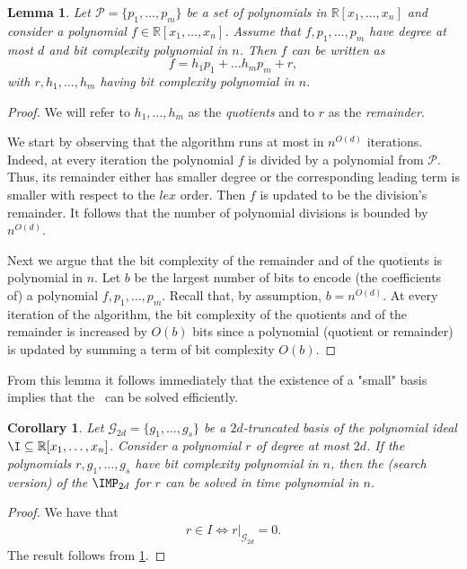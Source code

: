 \documentclass[11pt]{article}
\newtheorem{lemma}[theorem]{Lemma}
\newtheorem{corollary}[theorem]{Corollary}
\begin{document}
\begin{lemma}\label{th:complexity_polynomial_division}
    Let $\mathcal{P} = \{p_1, \dots, p_m\}$ be a set of polynomials in $\mathbb{R}[x_1, \dots, x_n]$ and consider a polynomial $f \in \mathbb{R}[x_1, \dots, x_n]$. Assume that $f, p_1, \dots, p_m$ have degree at most $d$ and bit complexity polynomial in $n$. Then $f$ can be written as
    \begin{equation*}
        f = h_1 p_1 + \dots h_m p_m + r,
    \end{equation*}
    with $r, h_1, \dots, h_m$ having bit complexity polynomial in $n$.
\end{lemma}

\begin{proof}
    We will refer to $h_1, \dots, h_m$ as the \emph{quotients} and to $r$ as the \emph{remainder}.
    
    We start by observing that the algorithm runs at most in $n^{O(d)}$ iterations. Indeed, at every iteration the polynomial $f$ is divided by a polynomial from $\mathcal{P}$. Thus, its remainder either has smaller degree or the corresponding leading term is smaller with respect to the $lex$ order. Then $f$ is updated to be the division's remainder. It follows that the number of polynomial divisions is bounded by $n^{O(d)}$.

    Next we argue that the bit complexity of the remainder and of the quotients is polynomial in $n$. Let $b$ be the largest number of bits to encode (the coefficients of) a polynomial $f, p_1, \dots, p_m$. Recall that, by assumption, $b = n^{O(d)}$. At every iteration of the algorithm, the bit complexity of the quotients and of the remainder is increased by $O(b)$ bits since a polynomial (quotient or remainder) is updated by summing a term of bit complexity $O(b)$.
\end{proof}

From this lemma it follows immediately that the existence of a "small" \GB basis implies that the \IMP\ can be solved efficiently.

\begin{corollary}
    Let $\mathcal{G}_{2d} = \{g_1, \dots, g_s\}$ be a $2d$-truncated \GB basis of the polynomial ideal $\I \subseteq \mathbb{R}[x_1, \dots, x_n]$. Consider a polynomial $r$ of degree at most $2d$. If the polynomials $r,g_1, \dots, g_s$ have bit complexity polynomial in $n$, then the (search version) of the $\IMP_{2d}$ for $r$ can be solved in time polynomial in $n$.
\end{corollary}

\begin{proof}
    We have that 
    \begin{align*}
        r \in I \iff r|_{\mathcal{G}_{2d}} = 0.
    \end{align*}
    The result follows from \cref{th:complexity_polynomial_division}.
\end{proof}
\end{document}
